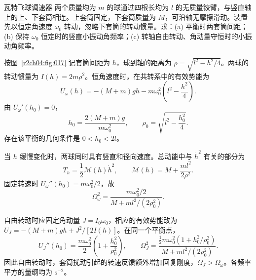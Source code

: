 \begin{practicebox}{瓦特飞球调速器}
两个质量均为 $m$ 的球通过四根长均为 $l$ 的无质量铰臂，与竖直轴上的上、下套筒相连。上套筒固定，下套筒质量为 $M$，可沿轴无摩擦滑动。装置先以恒定角速度 $\omega_0$ 转动，忽略下套筒的转动惯量。求：(a) 平衡时两套筒间距；(b) 保持 $\omega_0$ 恒定时的竖直小振动角频率；(c) 转轴自由转动、角动量守恒时的小振动角频率。
\label{r2ch04:pr:002}
\begin{solution}
按图~\ref{r2ch04:fig:017} 记套筒间距为 $h$，球到轴的距离为
$\rho=\sqrt{l^2-h^2/4}$。两球的转动惯量为 $I(h)=2m\rho^2$。恒角速度时，在共转系中的有效势能为
\begin{equation}
 U_{\omega}(h)=-(M+m)gh-m\omega_0^2\left(l^2-\frac{h^2}{4}\right).
 \label{r2ch04:eq:040}
\end{equation}
由 $U_\omega'(h_0)=0$，
\[
 \boxed{h_0=\frac{2(M+m)g}{m\omega_0^2}},\qquad
 \rho_0=\sqrt{l^2-\frac{h_0^2}{4}}.
\]
存在该平衡的几何条件是 $0<h_0<2l$。

当 $h$ 缓慢变化时，两球同时具有竖直和径向速度。总动能中与 $\dot h^2$ 有关的部分为
\begin{equation}
 T_h=\frac12\mathcal M(h)\dot h^2,\qquad
 \mathcal M(h)=M+\frac{ml^2}{2\rho^2}.
 \label{r2ch04:eq:041}
\end{equation}
固定转速时 $U_\omega''(h_0)=m\omega_0^2/2$，故
\[
 \boxed{\Omega_{\omega}^2=
 \frac{m\omega_0^2/2}{M+ml^2/(2\rho_0^2)}}.
\]

自由转动时应固定角动量 $J=I_0\omega_0$，相应的有效势能改为
$U_J=-(M+m)gh+J^2/[2I(h)]$。在同一个平衡点，
\begin{equation}
 U_J''(h_0)=\frac{m\omega_0^2}{2}\left(1+\frac{h_0^2}{\rho_0^2}\right),\qquad
 \boxed{\Omega_J^2=
 \frac{\frac12m\omega_0^2(1+h_0^2/\rho_0^2)}{M+ml^2/(2\rho_0^2)}}.
 \label{r2ch04:eq:042}
\end{equation}
因此自由转动时，套筒扰动引起的转速反馈额外增加回复刚度，$\Omega_J>\Omega_\omega$。各频率平方的量纲均为 $\mathrm{s}^{-2}$。
\figFlyballGovernor
\end{solution}
\end{practicebox}

